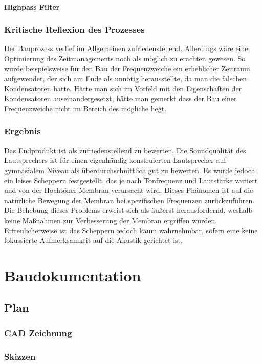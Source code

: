 \documentclass[a4paper,11pt]{report}
\begin{document}
\subsection{Highpass Filter}

\section{Kritische Reflexion des Prozesses}
Der Bauprozess verlief im Allgemeinen zufriedenstellend. Allerdings wäre eine Optimierung des Zeitmanagements noch als möglich zu erachten gewesen. So wurde beispielsweise für den Bau der Frequenzweiche ein erheblicher Zeitraum aufgewendet, der sich am Ende als unnötig herausstellte, da man die falschen Kondensatoren hatte. Hätte man sich im Vorfeld mit den Eigenschaften der Kondensatoren auseinandergesetzt, hätte man gemerkt dass der Bau einer Frequenzweiche nicht im Bereich des mögliche liegt.

\section{Ergebnis}
Das Endprodukt ist als zufriedenstellend zu bewerten. Die Soundqualität des Lautsprechers ist für einen eigenhändig konstruierten Lautsprecher auf gymnasialem Niveau als überdurchschnittlich gut zu bewerten. Es wurde jedoch ein leises Scheppern festgestellt, das je nach Tonfrequenz und Lautstärke variiert und von der Hochtöner-Membran verursacht wird. Dieses Phänomen ist auf die natürliche Bewegung der Membran bei spezifischen Frequenzen zurückzuführen. Die Behebung dieses Problems erweist sich als äußerst herausfordernd, weshalb keine Maßnahmen zur Verbesserung der Membran ergriffen wurden. Erfreulicherweise ist das Scheppern jedoch kaum wahrnehmbar, sofern eine keine fokussierte Aufmerksamkeit auf die Akustik gerichtet ist.


\part{Baudokumentation}

\chapter{Plan}
\section{CAD Zeichnung}
\section{Skizzen}
\end{document}
